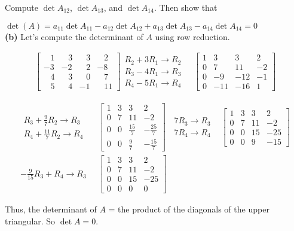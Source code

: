 \documentclass[a4paper,11pt,reqno]{amsart}
\numberwithin{equation}{section}
\begin{document}
\begin{center}
{{Compute \(\det A_{12}\), \(\det A_{13}\), and \(\det A_{14}\).
Then show that 

\(
\det(A) = a_{11} \det A_{11} - a_{12} \det A_{12} + a_{13} \det A_{13} - a_{14} \det A_{14} = 0
\)
\\

\textbf{(b)}
Let's compute the determinant of  \(A\) using row reduction.

\begin{eqnarray*}
\begin{bmatrix}
        \;\;\;1 & \;\;\;3 & \;\;\;3 & \;\;\;2\\
        -3 & -2 & \;\;\;2 & -8 \\
        \;\;\;4 & \;\;\;3 & \;\;\;0 & \;\;\;7\\
         \;\;\;5 & \;\;\;4 & -1 & \;\;\;11
    \end{bmatrix}
\begin{array}{c}
  R_2 + 3R_1 \to R_2\\  
  R_3 - 4R_1 \to R_3\\
  R_4 - 5R_1 \to R_4
\end{array}
&\;
\begin{bmatrix}
1 & 3 & 3 & 2 \\
0 & 7 & 11 & -2 \\
0 & -9 & -12 & -1 \\
0 & -11 & -16 & 1
\end{bmatrix}
\end{eqnarray*}

\begin{eqnarray*}
\begin{array}{c}
    R_3 + \frac{9}{7} R_2 \to R_3\\
    R_4 + \frac{11}{7} R_2 \to R_4
\end{array}\;\;
&
\begin{bmatrix}
1 & 3 & 3 & 2 \\
0 & 7 & 11 & -2 \\
0 & 0 & \frac{15}{7} & -\frac{25}{7} \\
0 & 0 & \frac{9}{7} & -\frac{15}{7}
\end{bmatrix}
\;\;
\begin{array}{c}
    7 R_3 \to R_3\\
   7 R_4 \to R_4
\end{array}
&
\begin{bmatrix}
1 & 3 & 3 & 2 \\
0 & 7 & 11 & -2 \\
0 & 0 & 15 & -25 \\
0 & 0 & 9 & -15
\end{bmatrix}
\\
-\frac{9}{15}R_3 + R_4 \to R_3
&
\begin{bmatrix}
1 & 3 & 3 & 2 \\
0 & 7 & 11 & -2 \\
0 & 0 & 15 & -25 \\
0 & 0 & 0 & 0
\end{bmatrix}
\end{eqnarray*}


Thus, the determinant of \( A \) = the product of the diagonals of the upper triangular.
So \(\det A=0\).
}}
\end{center}
\end{document}
